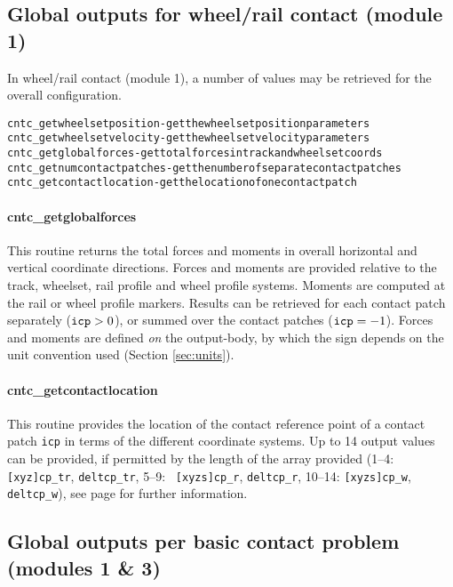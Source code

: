 \documentclass[12pt]{report}
\begin{document}
\subsection{Global outputs for wheel/rail contact (module 1)}
\label{sec:global_output1}

In wheel/rail contact (module 1), a number of values may be retrieved for
the overall configuration.
\begin{alltt}\small
cntc_getwheelsetposition    - get the wheelset position parameters
cntc_getwheelsetvelocity    - get the wheelset velocity parameters
cntc_getglobalforces        - get total forces in track and wheelset coords
cntc_getnumcontactpatches   - get the number of separate contact patches
cntc_getcontactlocation     - get the location of one contact patch
\end{alltt}

\paragraph{cntc\_getglobalforces}

This routine returns the total forces and moments in overall horizontal and
vertical coordinate directions. Forces and moments are provided relative to
the track, wheelset, rail profile and wheel profile systems.  Moments are
computed at the rail or wheel profile markers.  Results can be retrieved
for each contact patch separately (${\tt icp}>0$), or summed over the
contact patches (${\tt icp}=-1$).  Forces and moments are defined {\em
on\/} the output-body, by which the sign depends on the unit convention
used (Section \ref{sec:units}).

\paragraph{cntc\_getcontactlocation}

This routine provides the location of the contact reference point of a
contact patch {\tt icp} in terms of the different coordinate systems. Up to
14 output values can be provided, if permitted by the length of the array
provided (1--4: {\tt [xyz]cp\_tr}, {\tt deltcp\_tr}, 5--9: {\tt
[xyzs]cp\_r}, {\tt deltcp\_r}, 10--14: {\tt [xyzs]cp\_w}, {\tt deltcp\_w}),
see page \pageref{pg:contact_refpos} for further information.

\subsection{Global outputs per basic contact problem (modules 1 \& 3)}
\label{sec:global_output3}
\end{document}
